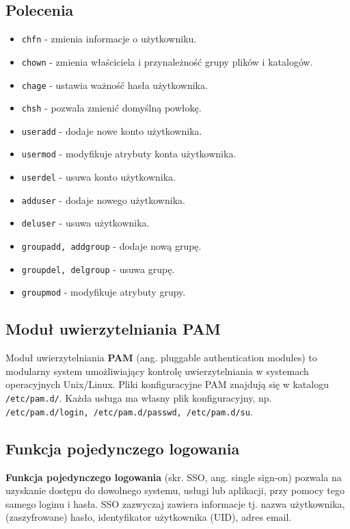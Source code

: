 \documentclass{article}
\begin{document}
\subsection{Polecenia}
\begin{itemize}
    \item \texttt{chfn} - zmienia informacje o użytkowniku.
    \item \texttt{chown} - zmienia właściciela i przynależność grupy plików i katalogów.
    \item \texttt{chage} - ustawia ważność hasła użytkownika.
    \item \texttt{chsh} - pozwala zmienić domyślną powłokę.
    \item \texttt{useradd} - dodaje nowe konto użytkownika.
    \item \texttt{usermod} - modyfikuje atrybuty konta użytkownika.
    \item \texttt{userdel} - usuwa konto użytkownika.
    \item \texttt{adduser} - dodaje nowego użytkownika.
    \item \texttt{deluser} - usuwa użytkownika.
    \item \texttt{groupadd, addgroup} - dodaje nową grupę.
    \item \texttt{groupdel, delgroup} - usuwa grupę.
    \item \texttt{groupmod} - modyfikuje atrybuty grupy.
\end{itemize}

\subsection{Moduł uwierzytelniania PAM}
Moduł uwierzytelniania \textbf{PAM} (ang. pluggable authentication modules) to modularny system umożliwiający kontrolę uwierzytelniania w systemach operacyjnych Unix/Linux. Pliki konfiguracyjne PAM znajdują się w katalogu \texttt{/etc/pam.d/}. Każda usługa ma własny plik konfiguracyjny, np. \texttt{/etc/pam.d/login, /etc/pam.d/passwd, /etc/pam.d/su}.

\subsection{Funkcja pojedynczego logowania}
\textbf{Funkcja pojedynczego logowania} (skr. SSO, ang. single sign-on) pozwala na uzyskanie dostępu do dowolnego systemu, usługi lub aplikacji, przy pomocy tego samego loginu i hasła. SSO zazwyczaj zawiera informacje tj. nazwa użytkownika, (zaszyfrowane) hasło, identyfikator użytkownika (UID), adres email.
\end{document}
